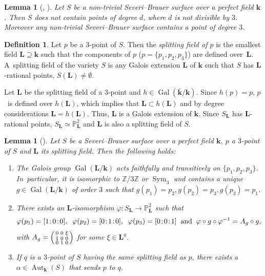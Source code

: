 \documentclass[JEP,XML,SOM,Unicode,NoFloatCountersInSection, NoEqCountersInSection,published]{cedram}
\newenvironment{Smallpmatrix}{\Big(\begin{smallmatrix}}{\end{smallmatrix}\Big)}
\newcommand{\sep}{\mkern2mu{:}\mkern2mu}
\DeclareMathOperator{\Gal}{Gal}
\DeclareMathOperator{\Sym}{Sym}
\newtheorem{lemma}[theorem]{Lemma}
\theoremstyle{definition}
\newtheorem{definition}[theorem]{Definition}
\newcommand{\kk}{{\boldsymbol{k}}}
\newcommand{\LL}{{\boldsymbol{L}}}
\DeclareMathOperator{\Aut}{Aut}
\begin{document}
\begin{lemma}[{\cite[Cor.\,2.2.2 with $p=3$]{BSY}}, {\cite{kollár2025severibrauervarietiesgeometrictreatment}}]
Let $S$ be a non-trivial Severi--Brauer surface over a perfect field $\kk$. Then $S$ does not contain points of degree $d$, where $d$ is not divisible by $3$. Moreover any non-trivial Severi--Brauer surface contains a point of degree $3$.
\end{lemma}

\begin{definition}
Let $p$ be a $3$\nobreakdash-point of $S$. Then the \emph{splitting field of $p$} is the smallest field $\LL \supseteq \kk$ such that the components of $p$ ($p = \{ p_1, p_2, p_3 \}$) are defined over~$\LL$. A~splitting field of the variety $S$ is any Galois extension $\LL$ of $\kk$ such that $S$ has $\LL$-rational points, $S(\LL) \neq \emptyset$.
\end{definition}

Let $\LL$ be the splitting field of a $3$\nobreakdash-point and $h \in \Gal(\bar{\kk}/\kk)$. Since $h(p) = p$, $p$~is defined over $h(\LL)$, which implies that $\LL \subset h(\LL)$ and by degree considerations $\LL = h(\LL)$. Thus, $\LL$ is a Galois extension of $\kk$. Since $S_{\LL}$ has $\LL$-rational points, $S_{\LL} \simeq \mathbb{P}^2_{\LL}$ and $\LL$ is also a splitting field of $S$.

\begin{lemma} [{\cite[Lem.\,2.3.2]{BSY}}] \label{3pLem}
Let $S$ be a Severi--Brauer surface over a perfect field $\kk$, $p$ a $3$\nobreakdash-point of $S$ and $\LL$ its splitting field. Then the following holds:
\begin{enumerate}
\item
The Galois group $\Gal(\LL/\kk)$ acts faithfully and transitively on $\{ p_1, p_2, p_3 \}$. In~particular, it is isomorphic to $\mathbb{Z}/3\mathbb{Z}$ or $\Sym_3$ and contains a unique $g \in \Gal(\LL/\kk)$ of order $3$ such that $g(p_1) = p_2, g(p_2) = p_3, g(p_3) = p_1$.
\item
There exists an $\LL$-isomorphism $\varphi \colon S_{\LL} \to \mathbb{P}^2_{\LL}$ such that\[
\varphi(p_1) = [1\sep 0\sep 0],\;\; \varphi(p_2) = [0\sep 1\sep 0],\;\; \varphi(p_3) = [0\sep 0\sep 1]\;\;\text{and}\;\;\varphi \circ g \circ \varphi^{-1} = A_g \circ g,
\]
with
$A_g = \begin{Smallpmatrix}
0 & 0 & \xi\\
1 & 0 & 0 \\
0 & 1 & 0
\end{Smallpmatrix}$
for some $\xi \in \LL^g$.
\item
If $q$ is a $3$\nobreakdash-point of $S$ having the same splitting field as $p$, there exists a $\alpha \in \Aut_{\kk}(S)$ that sends $p$ to $q$.
\end{enumerate}
\end{lemma}
\end{document}
